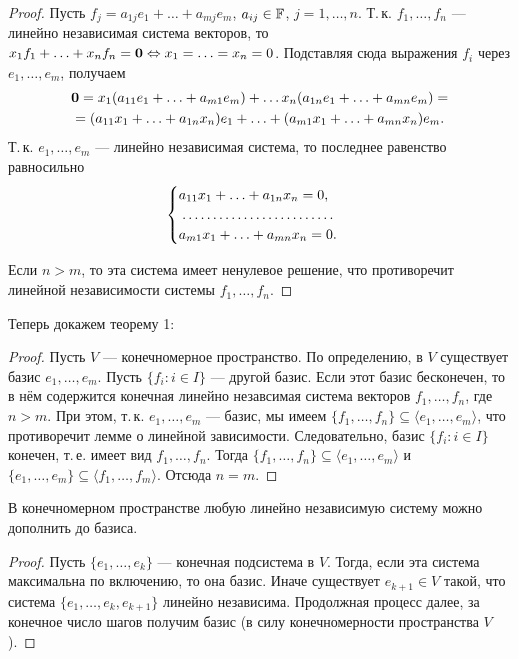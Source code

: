 \begin{proof}
    Пусть $f_j = a_{1j}e_1 + \ldots + a_{mj}e_m$, $a_{ij} \in \mathbb{F}$, $j = 1, \ldots, n$. Т.\,к. $f_1, \ldots, f_n$ --- линейно независимая система векторов, то $x_1f_1 + \ldots + x_nf_n = \boldsymbol{0} \Leftrightarrow x_1 = \ldots = x_n = 0$. Подставляя сюда выражения $f_i$ через $e_1, \ldots, e_m$, получаем
    \begin{multline*}
        \boldsymbol{0} = x_1(a_{11}e_1 + \ldots + a_{m1}e_m) + \ldots x_n(a_{1n}e_1 + \ldots + a_{mn}e_m) =\\ = (a_{11}x_1 + \ldots + a_{1n}x_n)e_1 + \ldots + (a_{m1}x_1 + \ldots + a_{mn}x_n)e_m.
    \end{multline*}
    Т.\,к. $e_1, \ldots, e_m$ --- линейно независимая система, то последнее равенство равносильно
    \[
        \begin{cases}
            a_{11}x_1 + \ldots + a_{1n}x_n = 0,\\
            \dotfill\\
            a_{m1}x_1 + \ldots + a_{mn}x_n = 0.
        \end{cases}
    \]

    Если $n > m$, то эта система имеет ненулевое решение, что противоречит линейной независимости системы $f_1, \ldots, f_n$.
\end{proof}

Теперь докажем теорему 1:

\begin{proof}
    Пусть $V$ --- конечномерное пространство. По определению, в $V$ существует базис $e_1, \ldots, e_m$. Пусть $\{f_i : i \in I\}$ --- другой базис. Если этот базис бесконечен, то в нём содержится конечная линейно незавсимая система векторов $f_1, \ldots, f_n$, где $n > m$. При этом, т.\,к. $e_1, \ldots, e_m$ --- базис, мы имеем $\{f_1, \ldots, f_n\} \subseteq \langle e_1, \ldots, e_m\rangle$, что противоречит лемме о линейной зависимости. Следовательно, базис $\{f_i : i \in I\}$ конечен, т.\,е. имеет вид $f_1, \ldots, f_n$. Тогда $\{f_1, \ldots, f_n\} \subseteq \langle e_1, \ldots, e_m \rangle$ и $\{e_1, \ldots, e_m\} \subseteq \langle f_1, \ldots, f_m\rangle$. Отсюда $n = m$.
\end{proof}

\begin{lemma}
    В конечномерном пространстве любую линейно независимую систему можно дополнить до базиса.
\end{lemma}

\begin{proof}
    Пусть $\{e_1, \ldots, e_k\}$ --- конечная подсистема в $V$. Тогда, если эта система максимальна по включению, то она базис. Иначе существует $e_{k + 1} \in V$ такой, что система $\{e_1, \ldots, e_k, e_{k + 1}\}$ линейно независима. Продолжная процесс далее, за конечное число шагов получим базис (в силу конечномерности пространства $V$).
\end{proof}

